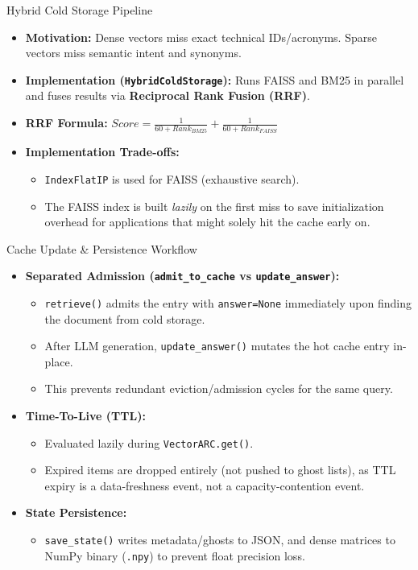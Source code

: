 \documentclass[aspectratio=169]{beamer}
\begin{document}
\begin{frame}{Hybrid Cold Storage Pipeline}
    \begin{itemize}
        \item \textbf{Motivation:} Dense vectors miss exact technical IDs/acronyms. Sparse vectors miss semantic intent and synonyms.
        \item \textbf{Implementation (\texttt{HybridColdStorage}):} Runs FAISS and BM25 in parallel and fuses results via \textbf{Reciprocal Rank Fusion (RRF)}.
        \item \textbf{RRF Formula:} $Score = \frac{1}{60 + Rank_{BM25}} + \frac{1}{60 + Rank_{FAISS}}$
        \item \textbf{Implementation Trade-offs:}
        \begin{itemize}
            \item \texttt{IndexFlatIP} is used for FAISS (exhaustive search).
            \item The FAISS index is built \textit{lazily} on the first miss to save initialization overhead for applications that might solely hit the cache early on.
        \end{itemize}
    \end{itemize}
\end{frame}

\begin{frame}{Cache Update \& Persistence Workflow}
    \begin{itemize}
        \item \textbf{Separated Admission (\texttt{admit\_to\_cache} vs \texttt{update\_answer}):}
        \begin{itemize}
            \item \texttt{retrieve()} admits the entry with \texttt{answer=None} immediately upon finding the document from cold storage.
            \item After LLM generation, \texttt{update\_answer()} mutates the hot cache entry in-place.
            \item This prevents redundant eviction/admission cycles for the same query.
        \end{itemize}
        \item \textbf{Time-To-Live (TTL):}
        \begin{itemize}
            \item Evaluated lazily during \texttt{VectorARC.get()}.
            \item Expired items are dropped entirely (not pushed to ghost lists), as TTL expiry is a data-freshness event, not a capacity-contention event.
        \end{itemize}
        \item \textbf{State Persistence:}
        \begin{itemize}
            \item \texttt{save\_state()} writes metadata/ghosts to JSON, and dense matrices to NumPy binary (\texttt{.npy}) to prevent float precision loss.
        \end{itemize}
    \end{itemize}
\end{frame}
\end{document}
